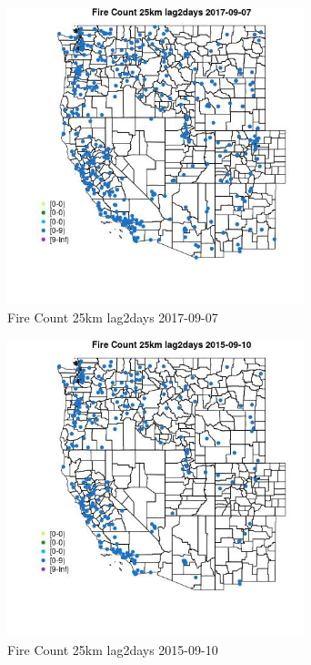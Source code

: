 \begin{figure} 
\centering  
\includegraphics[width=0.77\textwidth]{Code_Outputs/Report_ML_input_PM25_Step4_part_e_de_duplicated_aves_compiled_2019-05-21wNAs_MapObsFire_Count_25km_lag2days2017-09-07.jpg} 
\caption{\label{fig:Report_ML_input_PM25_Step4_part_e_de_duplicated_aves_compiled_2019-05-21wNAsMapObsFire_Count_25km_lag2days2017-09-07}Fire Count 25km lag2days 2017-09-07} 
\end{figure} 
 

\begin{figure} 
\centering  
\includegraphics[width=0.77\textwidth]{Code_Outputs/Report_ML_input_PM25_Step4_part_e_de_duplicated_aves_compiled_2019-05-21wNAs_MapObsFire_Count_25km_lag2days2015-09-10.jpg} 
\caption{\label{fig:Report_ML_input_PM25_Step4_part_e_de_duplicated_aves_compiled_2019-05-21wNAsMapObsFire_Count_25km_lag2days2015-09-10}Fire Count 25km lag2days 2015-09-10} 
\end{figure} 
 

